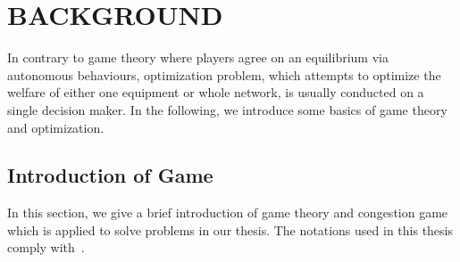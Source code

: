 \chapter{BACKGROUND}
\label{background}

In contrary to game theory where players agree on an equilibrium via autonomous behaviours, optimization problem, which attempts to optimize the welfare of either one equipment or whole network, is usually conducted on a single decision maker.
In the following, we introduce some basics of game theory and optimization.





 

\section{Introduction of Game}
In this section, we give a brief introduction of game theory and congestion game which is applied to solve problems in our thesis.
The notations used in this thesis comply with~\cite{agt_book}.



